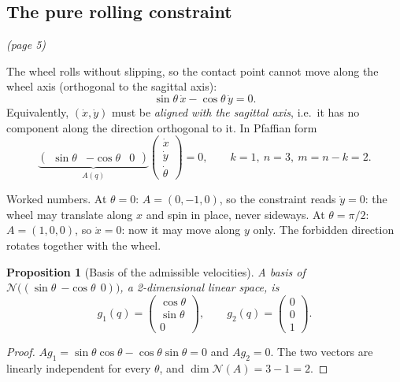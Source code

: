 \documentclass[11pt,a4paper]{article}
\newcommand{\N}{\mathcal{N}}
\theoremstyle{definition}
\theoremstyle{plain}
\newtheorem{proposition}[definition]{Proposition}
\theoremstyle{remark}
\begin{document}
\subsection{The pure rolling constraint}\emph{(page 5)}

The wheel rolls without slipping, so the contact point cannot move along the wheel axis (orthogonal to the sagittal axis):
\[
\sin\theta\,\dot x-\cos\theta\,\dot y=0 .
\]
Equivalently, $(\dot x,\dot y)$ must be \emph{aligned with the sagittal axis}, i.e.\ it has no component along the direction orthogonal to it. In Pfaffian form
\[
\underbrace{\begin{pmatrix}\sin\theta & -\cos\theta & 0\end{pmatrix}}_{A(q)}\begin{pmatrix}\dot x\\ \dot y\\ \dot\theta\end{pmatrix}=0,\qquad k=1,\ n=3,\ m=n-k=2 .
\]

\begin{intuition}
Worked numbers. At $\theta=0$: $A=(0,-1,0)$, so the constraint reads $\dot y=0$: the wheel may translate along $x$ and spin in place, never sideways. At $\theta=\pi/2$: $A=(1,0,0)$, so $\dot x=0$: now it may move along $y$ only. The forbidden direction rotates together with the wheel.
\end{intuition}

\begin{proposition}[Basis of the admissible velocities]\label{prop:basis}
A basis of $\N\big((\sin\theta\ \ {-\cos\theta}\ \ 0)\big)$, a 2-dimensional linear space, is
\[
g_1(q)=\begin{pmatrix}\cos\theta\\ \sin\theta\\ 0\end{pmatrix},\qquad g_2(q)=\begin{pmatrix}0\\0\\1\end{pmatrix}.
\]
\end{proposition}
\begin{proof}
$A g_1=\sin\theta\cos\theta-\cos\theta\sin\theta=0$ and $Ag_2=0$. The two vectors are linearly independent for every $\theta$, and $\dim\N(A)=3-1=2$.
\end{proof}
\end{document}
